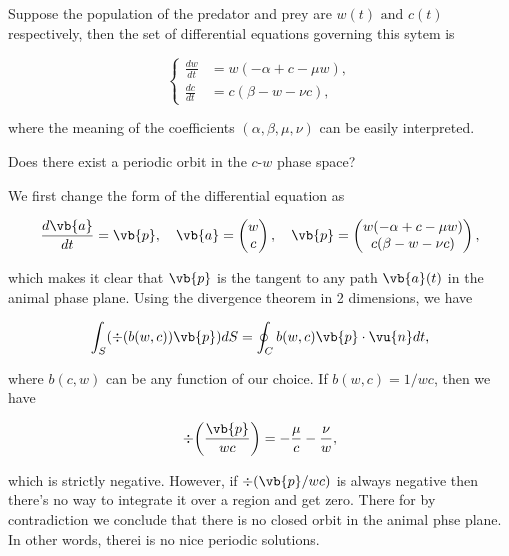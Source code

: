 \documentclass[english,a4paper,12pt]{report}
\begin{document}
{Suppose the population of the predator and prey are \(w(t) \text { and } c(t)\) respectively, then the set of differential equations governing this sytem is 

\begin{equation}
	\begin{cases}
		\frac{dw}{dt}  &= w(-\alpha +c-\mu w ),\\
		\frac{dc}{dt} &= c(\beta -w - \nu c ),
	\end{cases}
\end{equation}

where the meaning of the coefficients \((\alpha , \beta , \mu , \nu )\) can be easily interpreted.  

Does there exist a periodic orbit in the \(c\)-\(w\) phase space? 
}
{We first change the form of the differential equation as 

\begin{equation}
	\frac{d\vb{a} }{dt} = \vb{p} , \quad \vb{a} = \begin{pmatrix}
		 w \\
		 c \\
	\end{pmatrix}, \quad \vb{p} = \begin{pmatrix}
		 w(-\alpha +c-\mu w) \\
		 c(\beta -w-\nu c) \\
	\end{pmatrix},
\end{equation}

which makes it clear that \(\vb{p} \) is the tangent to any path \(\vb{a} (t)\) in the animal phase plane. Using the divergence theorem in 2 dimensions, we have

\begin{equation}
	\int_{S}^{} (\div{(b(w,c))\vb{p} } )dS = \oint_{C} b(w,c) \vb{p} \cdot \vu{n} dt,
\end{equation}

where \(b(c,w)\) can be any function of our choice. If \(b(w,c) = 1/wc\), then we have 

\begin{equation}
	\div{\left( \frac{\vb{p} }{wc}  \right)} = - \frac{\mu }{c} - \frac{\nu }{w},  
\end{equation}

which is strictly negative. However, if \(\div{(\vb{p} /wc)} \) is always negative then there's no way to integrate it over a region and get zero. There for by contradiction we conclude that there is no closed orbit in the animal phse plane. In other words, therei is no nice periodic solutions.


} 
\end{document}
